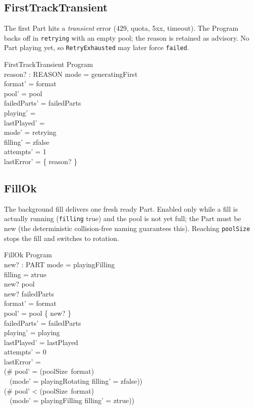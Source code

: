 \documentclass[a4paper,10pt,fleqn]{article}
\begin{document}
\subsection{FirstTrackTransient}

The first Part hits a \emph{transient} error (429, quota, 5xx, timeout). The
Program backs off in \texttt{retrying} with an empty pool; the reason is
retained as advisory. No Part playing yet, so \texttt{RetryExhausted} may later
force \texttt{failed}.

\begin{schema}{FirstTrackTransient}
  \Delta Program \\
  reason? : REASON
  \where
  mode = generatingFirst \\
  format' = format \\
  pool' = pool \\
  failedParts' = failedParts \\
  playing' = \emptyset \\
  lastPlayed' = \emptyset \\
  mode' = retrying \\
  filling' = zfalse \\
  attempts' = 1 \\
  lastError' = \{ reason? \}
\end{schema}

\subsection{FillOk}

The background fill delivers one fresh ready Part. Enabled only while a fill is
actually running (\texttt{filling} true) and the pool is not yet full; the Part
must be new (the deterministic collision-free naming guarantees this). Reaching
\texttt{poolSize} stops the fill and switches to rotation.

\begin{schema}{FillOk}
  \Delta Program \\
  new? : PART
  \where
  mode = playingFilling \\
  filling = ztrue \\
  new? \notin pool \\
  new? \notin \dom failedParts \\
  format' = format \\
  pool' = pool \cup \{ new? \} \\
  failedParts' = failedParts \\
  playing' = playing \\
  lastPlayed' = lastPlayed \\
  attempts' = 0 \\
  lastError' = \emptyset \\
  (\# pool' = (poolSize~format) \implies \\
    \quad~ (mode' = playingRotating \land filling' = zfalse)) \\
  (\# pool' < (poolSize~format) \implies \\
    \quad~ (mode' = playingFilling \land filling' = ztrue))
\end{schema}
\end{document}
